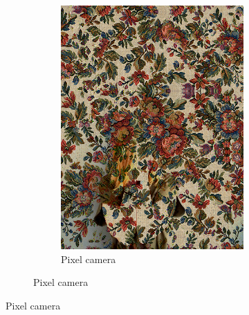 \begin{figure}[]
\begin{subfigure}{\textwidth}
\begin{subfigure}{0.24\textwidth}
            \includegraphics[width=\textwidth]{images/04-experiment02/human/flowers/pixel_proj.jpg}
            \caption*{Pixel camera}
        \end{subfigure}
    \end{subfigure}


\end{figure}
